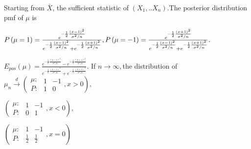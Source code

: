 \documentclass{article}
\begin{document}

Starting from $\bar{X}$, the sufficient statistic of $\left(
X_{1},..X_{n}\right) .$The posterior distribution pmf of $\mu $ is

$P\left( \mu =1\right) =\frac{e^{-\frac{1}{2}\frac{\left( x-1\right) ^{2}}{%
\sigma ^{2}/n}}}{e^{-\frac{1}{2}\frac{\left( x-1\right) ^{2}}{\sigma ^{2}/n}%
}+e^{-\frac{1}{2}\frac{\left( x+1\right) ^{2}}{\sigma ^{2}/n}}},P\left( \mu
=-1\right) =\frac{e^{-\frac{1}{2}\frac{\left( x+1\right) ^{2}}{\sigma ^{2}/n}%
}}{e^{-\frac{1}{2}\frac{\left( x-1\right) ^{2}}{\sigma ^{2}/n}}+e^{-\frac{1}{%
2}\frac{\left( x+1\right) ^{2}}{\sigma ^{2}/n}}}.$

\bigskip $E_{pos}\left( \mu \right) =\frac{e^{-\frac{1}{2}\frac{\left(
x-1\right) ^{2}}{\sigma ^{2}/n}}-e^{-\frac{1}{2}\frac{\left( x+1\right) ^{2}%
}{\sigma ^{2}/n}}}{e^{-\frac{1}{2}\frac{\left( x-1\right) ^{2}}{\sigma ^{2}/n%
}}+e^{-\frac{1}{2}\frac{\left( x+1\right) ^{2}}{\sigma ^{2}/n}}}.$ If $%
n\rightarrow \infty ,$the distribution of $\mu _{n}\overset{d}{\rightarrow }%
\left( 
\begin{array}{c}
\mu : \\ 
P:%
\end{array}%
\begin{array}{cc}
1 & -1 \\ 
1 & 0%
\end{array}%
,x>0\right) ,$

$\left( 
\begin{array}{c}
\mu : \\ 
P:%
\end{array}%
\begin{array}{cc}
1 & -1 \\ 
0 & 1%
\end{array}%
,x<0\right) ,$

$\left( 
\begin{array}{c}
\mu : \\ 
P:%
\end{array}%
\begin{array}{cc}
1 & -1 \\ 
\frac{1}{2} & \frac{1}{2}%
\end{array}%
,x=0\right) $

\bigskip

\bigskip 
\end{document}
